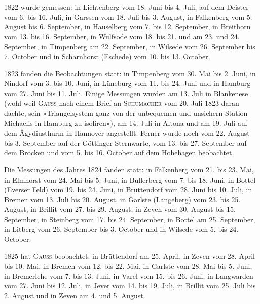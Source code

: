 \par\noindent\hspace*{\parindent}1822 wurde gemessen: in Lichtenberg vom 18. Juni bis 4. Juli, auf dem Deister vom 6. bis 16. Juli, in Garssen vom 18. Juli bis 3. August, in Falkenberg vom 5. August bis 6. September, in Hauselberg vom 7. bis 12. September, in Breithorn vom 13. bis 16. September, in Wulfsode vom 18. bis 21. und am 23. und 24. September, in Timpenberg am 22. September, in Wilsede vom 26. September bis 7. October und in Scharnhorst (Eschede) vom 10. bis 13. October.

\par\noindent\hspace*{\parindent}1823 fanden die Beobachtungen statt: in Timpenberg vom 30. Mai bis 2. Juni, in Nindorf vom 3. bis 10. Juni, in Lüneburg vom 11. bis 24. Juni und in Hamburg vom 27. Juni bis 11. Juli. Einige Messungen wurden am 13. Juli in Blankenese (wohl weil \textsc{Gauss} nach einem Brief an \textsc{Schumacher} vom 20. Juli 1823 daran dachte, sein »Triangelsystem ganz von der unbequemen und unsichern Station Michaelis in Hamburg zu isoliren«), am 14. Juli in Altona und am 19. Juli auf dem Ägydiusthurm in Hannover angestellt. Ferner wurde noch vom 22. August bis 3. September auf der Göttinger Sternwarte, vom 13. bis 27. September auf dem Brocken und vom 5. bis 16. October auf dem Hohehagen beobachtet.

\par\noindent\hspace*{\parindent}Die Messungen des Jahres 1824 fanden statt: in Falkenberg vom 21. bis 23. Mai, in Elmhorst vom 24. Mai bis 5. Juni, in Bullerberg vom 7. bis 18. Juni, in Bottel (Everser Feld) vom 19. bis 24. Juni, in Brüttendorf vom 28. Juni bis 10. Juli, in Bremen vom 13. Juli bis 20. August, in Garlste (Langeberg) vom 23. bis 25. August, in Brillit vom 27. bis 29. August, in Zeven vom 30. August bis 15. September, in Steinberg vom 17. bis 24. September, in Bottel am 25. September, in Litberg vom 26. September bis 3. October und in Wilsede vom 5. bis 24. October.

\par\noindent\hspace*{\parindent}1825 hat \textsc{Gauss} beobachtet: in Brüttendorf am 25. April, in Zeven vom 28. April bis 10. Mai, in Bremen vom 12. bis 22. Mai, in Garlste vom 28. Mai bis 5. Juni, in Bremerlehe vom 7. bis 13. Juni, in Varel vom 15. bis 26. Juni, in Langwarden vom 27. Juni bis 12. Juli, in Jever vom 14. bis 19. Juli, in Brillit vom 25. Juli bis 2. August und in Zeven am 4. und 5. August.

